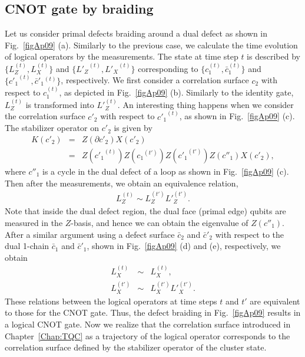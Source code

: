 \subsection*{CNOT gate by braiding}
Let us consider primal defects braiding around a dual defect as shown in Fig.~\ref{figAp09} (a).
Similarly to the previous case, we calculate the time evolution of logical operators by the measurements.
The state at time step $t$ is described by $\{ L_Z^{(t)}, L_X^{(t)}\}$ and $\{ {L'_Z}^{(t)}, {L'_X}^{(t)}\}$ corresponding to $\{ c_1^{(t)}, \bar c_1^{(t)}\}$ and 
$\{ {c'_1}^{(t)}, {{\bar c}'_1}{}^{(t)} \}$, respectively.
We first consider a correlation surface $c_2$ with respect to $c_1^{(t)}$, as depicted in Fig.~\ref{figAp09} (b). 
Similarly to the identity gate, $L_Z^{(t)}$ is transformed into ${L'}_Z^{(t)}$.
An interesting thing happens when we consider the correlation surface $c'_2$ with respect to ${c'_1}^{(t)}$, as shown in Fig.~\ref{figAp09} (c).
The stabilizer operator on $c'_2$ is given by 
\begin{eqnarray}
K(c'_2) &=& Z(\partial c'_2) X( c'_2)
\nonumber \\
&=& Z({c'_1}^{(t)}) Z({c_1}^{(t')}) Z({c'_1}^{(t')}) Z(c''_1) X(c'_2) ,
\end{eqnarray}
where $c''_1$ is a cycle in the dual defect of a loop as shown in Fig.~\ref{figAp09} (c).
Then after the measurements, we obtain an equivalence relation,
\begin{eqnarray}
L_Z^{(t)} \sim {L}_Z^{(t')} {L'}_Z^{(t')}.
\end{eqnarray}
Note that inside the dual defect region, the dual face (primal edge) qubits are measured in the $Z$-basis, and hence we can obtain the eigenvalue of $Z(c''_1)$.
After a similar argument using a defect surface $\bar c_2$ and $\bar c'_2$ with respect to the dual 1-chain $\bar c_1$ and $\bar c'_1$, shown in Fig.~\ref{figAp09} (d) and (e), respectively, we obtain 
\begin{eqnarray}
L_X^{(t)} &\sim& {L}_X^{(t)},
\\
L_X^{(t')} &\sim& {L}_X^{(t')} {L'}_X^{(t')}.
\end{eqnarray}
These relations between the logical operators at time steps $t$ and $t'$ are equivalent to those for the CNOT gate.
Thus, the defect braiding in Fig.~\ref{figAp09} results in a logical CNOT gate.
Now we realize that the correlation surface 
introduced in Chapter~\ref{Chap:TQC} 
as a trajectory of the logical operator 
corresponds to the correlation surface defined by the 
stabilizer operator of the cluster state.

